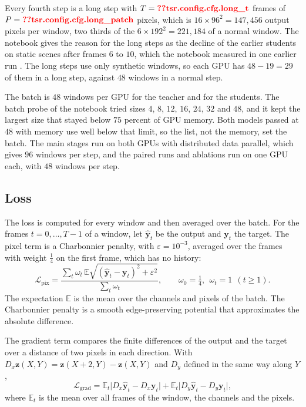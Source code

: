 Every fourth step is a long step with $T=\Res{tsr.config.cfg.long_t}$ frames of $P=\Res{tsr.config.cfg.long_patch}$ pixels, which is $16\times96^2=147{,}456$ output pixels per window, two thirds of the $6\times192^2=221{,}184$ of a normal window. The notebook gives the reason for the long steps as the decline of the earlier students on static scenes after frames $6$ to $10$, which the notebook measured in one earlier run \Preliminary. The long steps use only synthetic windows, so each GPU has $48-19=29$ of them in a long step, against $48$ windows in a normal step.

The batch is $48$ windows per GPU for the teacher and for the students. The batch probe of the notebook tried sizes $4$, $8$, $12$, $16$, $24$, $32$ and $48$, and it kept the largest size that stayed below $75$ percent of GPU memory. Both models passed at $48$ with memory use well below that limit, so the list, not the memory, set the batch. The main stages run on both GPUs with distributed data parallel, which gives $96$ windows per step, and the paired runs and ablations run on one GPU each, with $48$ windows per step.

\subsection{Loss}\label{sec:tsrm-loss}

The loss is computed for every window and then averaged over the batch. For the frames $t=0,\dots,T-1$ of a window, let $\hat{\mathbf{y}}_t$ be the output and $\mathbf{y}_t$ the target. The pixel term is a Charbonnier penalty, with $\varepsilon=10^{-3}$, averaged over the frames with weight $\tfrac14$ on the first frame, which has no history:
\begin{equation}\label{eq:tsrm-lpix}
\mathcal{L}_\mathrm{pix}=\frac{\sum_{t}\omega_t\,\mathbb{E}\sqrt{(\hat{\mathbf{y}}_t-\mathbf{y}_t)^2+\varepsilon^2}}{\sum_t\omega_t},\qquad \omega_0=\tfrac14,\ \ \omega_t=1\ \ (t\ge1).
\end{equation}
The expectation $\mathbb{E}$ is the mean over the channels and pixels of the batch. The Charbonnier penalty \cite{charbonnier1997deterministic} is a smooth edge-preserving potential that approximates the absolute difference.

The gradient term compares the finite differences of the output and the target over a distance of two pixels in each direction. With $D_x\mathbf{z}(X,Y)=\mathbf{z}(X+2,Y)-\mathbf{z}(X,Y)$ and $D_y$ defined in the same way along $Y$,
\begin{equation}\label{eq:tsrm-lgrad}
\mathcal{L}_\mathrm{grad}=\mathbb{E}_t\big|D_x\hat{\mathbf{y}}_t-D_x\mathbf{y}_t\big|+\mathbb{E}_t\big|D_y\hat{\mathbf{y}}_t-D_y\mathbf{y}_t\big|,
\end{equation}
where $\mathbb{E}_t$ is the mean over all frames of the window, the channels and the pixels.

